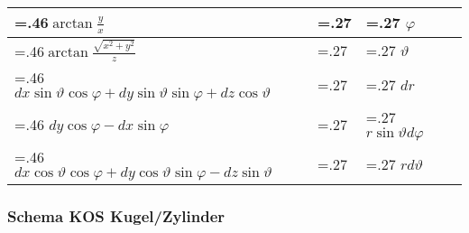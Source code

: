 \begin{tabularx}{0.45\textwidth}{>{\hsize=.46\hsize}X|>{\hsize=.27\hsize}X|>{\hsize=.27\hsize}X}
    \hline
    $\arctan \frac{y}{x}$                                                                &                  & $\varphi$                       \\
    \hline
    $\arctan \frac{\sqrt{x^{2}+y^{2}}}{z}$                                               &                  & $\vartheta$                     \\
    \hline
    $d x \sin \vartheta \cos \varphi+d y \sin \vartheta \sin \varphi+d z \cos \vartheta$ &                  & $dr$                            \\
    \hline
    $d y \cos \varphi-d x \sin \varphi$                                                  &                  & $r \sin \vartheta d \varphi$    \\
    \hline
    $d x \cos \vartheta \cos \varphi+d y \cos \vartheta \sin \varphi-d z \sin \vartheta$ &                  & $r d \vartheta$                 \\
\end{tabularx}

\subsubsection{Schema KOS Kugel/Zylinder}
